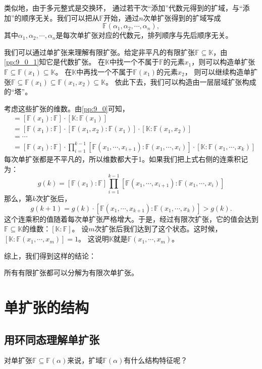 \documentclass[12pt,UTF8,fontset=none]{ctexbook}
\begin{document}
\begin{appendix}
类似地，由于多元整式是交换环，
通过若干次“添加”代数元得到的扩域，与“添加”的顺序无关。我们可以把从$\mathbb{F}$开始，通过$n$次单扩张得到的扩域写成
$$\mathbb{F}(\alpha_1, \alpha_2, \cdots, \alpha_n),$$
其中$\alpha_1, \alpha_2, \cdots, \alpha_n$是每次单扩张对应的代数元，排列顺序与先后顺序无关。

我们可以通过单扩张来理解有限扩张。给定非平凡的有限扩张$\mathbb{F} \subseteq \mathbb{K}$，由\ref{pp:9_0_1}知它是代数扩张。
在$\mathbb{K}$中找一个不属于$\mathbb{F}$的元素$x_1$，则可以构造单扩张$\mathbb{F} \subseteq \mathbb{F}(x_1) \subseteq \mathbb{K}$。
在$\mathbb{K}$中再找一个不属于$\mathbb{F}(x_1)$的元素$x_2$，
则可以继续构造单扩张$\mathbb{F} \subseteq \mathbb{F}(x_1) \subseteq \mathbb{F}(x_1, x_2) \subseteq \mathbb{K}$。
依此下去，我们可以构造由一层层域扩张构成的“塔”。

考虑这些扩张的维数。由\ref{pp:9_0}可知，
\begin{align*}
    [\mathbb{K} : \mathbb{F}] &= [\mathbb{F}(x_1) : \mathbb{F}]\cdot [\mathbb{K} : \mathbb{F}(x_1)]  \\
    &= [\mathbb{F}(x_1) : \mathbb{F}]\cdot [\mathbb{F}(x_1,x_2) : \mathbb{F}(x_1)] \cdot [\mathbb{K} : \mathbb{F}(x_1,x_2)]  \\
    &= \cdots  \\
    &= [\mathbb{F}(x_1) : \mathbb{F}]\cdot \prod_{i=1}^{k-1} [\mathbb{F}(x_1,\cdots,x_{i+1}) : \mathbb{F}(x_1,\cdots,x_i)] \cdot [\mathbb{K} : \mathbb{F}(x_1,\cdots,x_k)] 
\end{align*}
每次单扩张都是不平凡的，所以维数都大于1。如果我们把上式右侧的连乘积记为：
$$ g(k) = [\mathbb{F}(x_1) : \mathbb{F}] \prod_{i=1}^{k-1} [\mathbb{F}(x_1,\cdots,x_{i+1}) : \mathbb{F}(x_1,\cdots,x_i)]$$
那么，第$k$次扩张后，
$$g(k+1) = g(k) \cdot [\mathbb{F}(x_1,\cdots,x_{k+1}) : \mathbb{F}(x_1,\cdots,x_k)] > g(k).$$
这个连乘积的值随着每次单扩张严格增大。于是，经过有限次扩张，它的值会达到$\mathbb{F} \subseteq \mathbb{K}$的维数：$[\mathbb{K} : \mathbb{F}]$。
设$m$次扩张后我们达到了这个状态。这时候，$[\mathbb{K} : \mathbb{F}(x_1,\cdots , x_m)] = 1$。
这说明$\mathbb{K}$就是$\mathbb{F}(x_1,\cdots,x_m)$。

综上，我们得到这样的结论：
\begin{pp}\label{pp:9_2}
    所有有限扩张都可以分解为有限次单扩张。
\end{pp}

\section{单扩张的结构}
\subsection{用环同态理解单扩张}
对单扩张$\mathbb{F} \subseteq \mathbb{F}(\alpha)$来说，扩域$\mathbb{F}(\alpha)$有什么结构特征呢？


\end{appendix}
\end{document}
